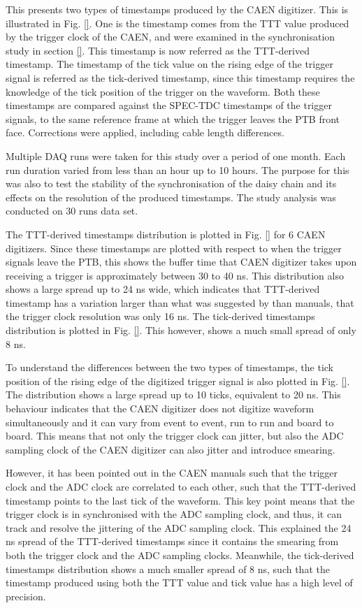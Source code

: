 This presents two types of timestamps produced by the CAEN digitizer.
This is illustrated in Fig. \ref {}.
One is the timestamp comes from the TTT value produced by the trigger clock of the CAEN, and were examined in the synchronisation study in section \ref {}.
This timestamp is now referred as the TTT-derived timestamp.
The timestamp of the tick value on the rising edge of the trigger signal is referred as the tick-derived timestamp, since this timestamp requires the knowledge of the tick position of the trigger on the waveform.
Both these timestamps are compared against the SPEC-TDC timestamps of the trigger signals, to the same reference frame at which the trigger leaves the PTB front face.
Corrections were applied, including cable length differences.

Multiple DAQ runs were taken for this study over a period of one month.
Each run duration varied from less than an hour up to 10 hours.
The purpose for this was also to test the stability of the synchronisation of the daisy chain and its effects on the resolution of the produced timestamps. 
The study analysis was conducted on 30 runs data set.

The TTT-derived timestamps distribution is plotted in Fig. \ref {} for 6 CAEN digitizers.
Since these timestamps are plotted with respect to when the trigger signals leave the PTB, this shows the buffer time that CAEN digitizer takes upon receiving a trigger is approximately between 30 to 40 ns.
This distribution also shows a large spread up to 24 ns wide, which indicates that TTT-derived timestamp has a variation larger than what was suggested by than manuals, that the trigger clock resolution was only 16 ns.
The tick-derived timestamps distribution is plotted in Fig. \ref {}.
This however, shows a much small spread of only 8 ns.

To understand the differences between the two types of timestamps, the tick position of the rising edge of the digitized trigger signal is also plotted in Fig. \ref {}.
The distribution shows a large spread up to 10 ticks, equivalent to 20 ns.
This behaviour indicates that the CAEN digitizer does not digitize waveform simultaneously and it can vary from event to event, run to run and board to board.
This means that not only the trigger clock can jitter, but also the ADC sampling clock of the CAEN digitizer can also jitter and introduce smearing.

However, it has been pointed out in the CAEN manuals such that the trigger clock and the ADC clock are correlated to each other, such that the TTT-derived timestamp points to the last tick of the waveform.
This key point means that the trigger clock is in synchronised with the ADC sampling clock, and thus, it can track and resolve the jittering of the ADC sampling clock.
This explained the 24 ns spread of the TTT-derived timestamps since it contains the smearing from both the trigger clock and the ADC sampling clocks.
Meanwhile, the tick-derived timestamps distribution shows a much smaller spread of 8 ns, such that the timestamp produced using both the TTT value and tick value has a high level of precision.

